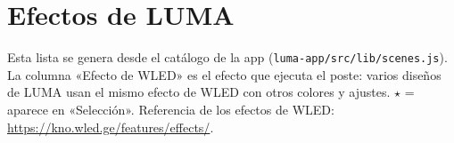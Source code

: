 \chapter{Efectos de LUMA}\label{anx:efectos}

Esta lista se genera desde el catálogo de la app (\texttt{luma-app/src/lib/scenes.js}). La columna «Efecto de WLED» es el efecto que ejecuta el poste: varios diseños de LUMA usan el mismo efecto de WLED con otros colores y ajustes. $\star$ = aparece en «Selección». Referencia de los efectos de WLED: \url{https://kno.wled.ge/features/effects/}.


